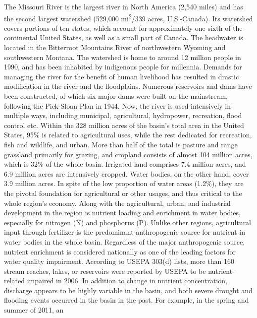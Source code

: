 \documentclass[12pt,]{article}
\begin{document}
The Missouri River is the largest river in North America (2,540 miles)
and has the second largest watershed (529,000 mi\textsuperscript{2}/339
acres, U.S.-Canada). Its watershed covers portions of ten states, which
account for approximately one-sixth of the continental United States, as
well as a small part of Canada. The headwater is located in the
Bitterroot Mountains River of northwestern Wyoming and southwestern
Montana. The watershed is home to around 12 million people in 1990, and
has been inhabited by indigenous people for millennia. Demands for
managing the river for the benefit of human livelihood has resulted in
drastic modification in the river and the floodplains. Numerous
reservoirs and dams have been constructed, of which six major dams were
built on the mainstream, following the Pick-Sloan Plan in 1944. Now, the
river is used intensively in multiple ways, including municipal,
agricultural, hydropower, recreation, flood control etc. \newline Within
the 328 million acres of the basin's total area in the United States,
95\% is related to agricultural uses, while the rest dedicated for
recreation, fish and wildlife, and urban. More than half of the total is
pasture and range grassland primarily for grazing, and cropland consists
of almost 104 million acres, which is 32\% of the whole basin. Irrigated
land comprises 7.4 million acres, and 6.9 million acres are intensively
cropped. Water bodies, on the other hand, cover 3.9 million acres. In
spite of the low proportion of water areas (1.2\%), they are the pivotal
foundation for agricultural or other usages, and thus critical to the
whole region's economy. \newline Along with the agricultural, urban, and
industrial development in the region is nutrient loading and enrichment
in water bodies, especially for nitrogen (N) and phosphorus (P). Unlike
other regions, agricultural input through fertilizer is the predominant
anthropogenic source for nutrient in water bodies in the whole basin.
Regardless of the major anthropogenic source, nutrient enrichment is
considered nationally as one of the leading factors for water quality
impairment. According to USEPA 303(d) lists, more than 160 stream
reaches, lakes, or reservoirs were reported by USEPA to be
nutrient-related impaired in 2006. \newline In addition to change in
nutrient concentration, discharge appears to be highly variable in the
basin, and both severe drought and flooding events occurred in the basin
in the past. For example, in the spring and summer of 2011, an
\end{document}
